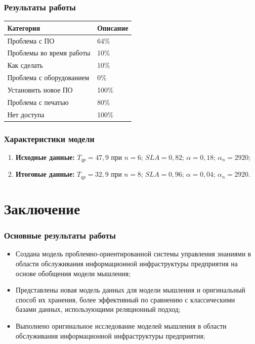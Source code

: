 \documentclass[14pt]{beamer}
\begin{document}
\begin{frame}
\frametitle{Результаты работы}
\begin{table}
	
\small
\begin{tabular} {|p{8cm}|p{2cm}|}

\hline
\textbf{Категория} & \textbf{Описание} \\
\hline
 Проблема с ПО    & 64\% \\
 \hline Проблемы во время работы  &  10\% \\
  \hline Как сделать & 10\% \\
   \hline
Проблема с оборудованием  & 0\% \\
 \hline
Установить новое ПО       & 100\% \\
 \hline Проблема с печатью        & 80\% \\
  \hline Нет доступа               & 100\% \\
  \hline
   \end{tabular}
\end{table}

\end{frame}

\begin{frame}
\frametitle{Характеристики модели}
\begin{enumerate}
 \item \textbf{Исходные данные:} $T_{qp}=47,9$ при $n=6$; $SLA=0,82$; $\alpha=0,18$;  $\alpha_n=2920$;
 \item \textbf{Итоговые данные:} $T_{qp}=32,9$ при $n=8$; $SLA=0,96$; $\alpha=0,04$;  $\alpha_n=2920$.
\end{enumerate}
\end{frame}


%
%
\section[Заключение]{Заключение}



\begin{frame}
\frametitle{Основные результаты работы}
\begin{itemize}
   \item Создана модель проблемно-ориентированной системы управления знаниями в области обслуживания информационной инфраструктуры предприятия на основе обобщения модели мышления;
  \item Представлены новая модель данных для модели мышления и оригинальный способ их хранения, более эффективный по сравнению с классическими базами данных, использующими реляционный подход;
  \item  Выполнено оригинальное исследование моделей мышления в области обслуживания информационной инфраструктуры предприятия;
  
\end{itemize}
\end{frame}
\end{document}
